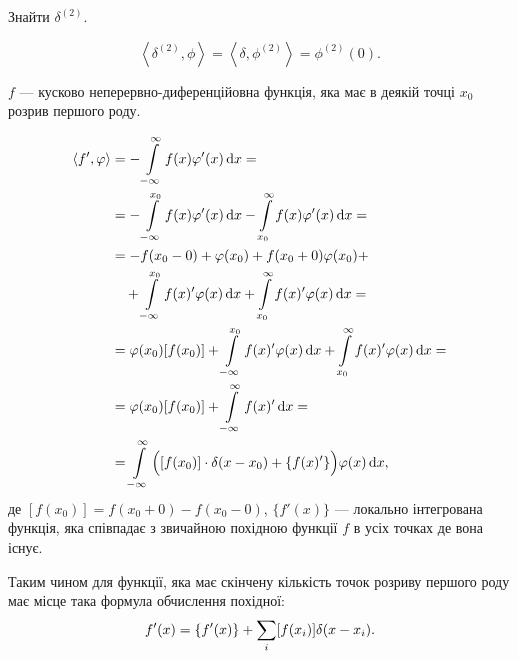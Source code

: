 \begin{example}
	Знайти $\delta^{(2)}$.
\end{example}

\begin{solution}
	\begin{equation}
		\left\langle \delta^{(2)}, \phi \right\rangle = \left\langle \delta, \phi^{(2)} \right\rangle = \phi^{(2)}(0).
	\end{equation}
\end{solution}

\begin{example}
	$f$ --- кусково неперервно-диференційовна функція, яка має в деякій точці $x_0$ розрив першого роду.
\end{example}

\begin{solution}
	\begin{equation}
		\begin{aligned}
			\langle f', \phi \rangle &= - \Int_{-\infty}^\infty f(x) \phi'(x) \diff x = \\
			&= - \Int_{-\infty}^{x_0} f(x) \phi'(x) \diff x -\Int_{x_0}^\infty f(x) \phi'(x) \diff x = \\
			&= - f(x_0 - 0) + \phi(x_0) + f(x_0 + 0) \phi(x_0) + \\
			&\quad + \Int_{-\infty}^{x_0} f(x)' \phi(x) \diff x + \Int_{x_0}^\infty f(x)' \phi(x) \diff x = \\
			&= \phi(x_0) [f(x_0)] + \Int_{-\infty}^{x_0} f(x)' \phi(x) \diff x + \Int_{x_0}^\infty f(x)' \phi(x) \diff x = \\
			&= \phi(x_0) [f(x_0)] + \Int_{-\infty}^\infty f(x)' \diff x  = \\
			&= \Int_{-\infty}^\infty \Big( [f(x_0)] \cdot \delta(x - x_0) + \{f(x)'\} \Big) \phi(x) \diff x,
		\end{aligned}
	\end{equation}
	де $[f(x_0)] = f(x_0 + 0) - f(x_0 - 0)$, $\{f'(x)\}$ --- локально інтегрована функція, яка співпадає з звичайною похідною функції $f$ в усіх точках де вона існує.
\end{solution}

\begin{remark}
	Таким чином для функції, яка має скінчену кількість точок розриву першого роду має місце така формула обчислення похідної:
	\begin{equation}
		f'(x) = \{f'(x)\} + \displaystyle\sum\limits_{i} [f(x_i)] \delta (x - x_i).
	\end{equation}
\end{remark}

